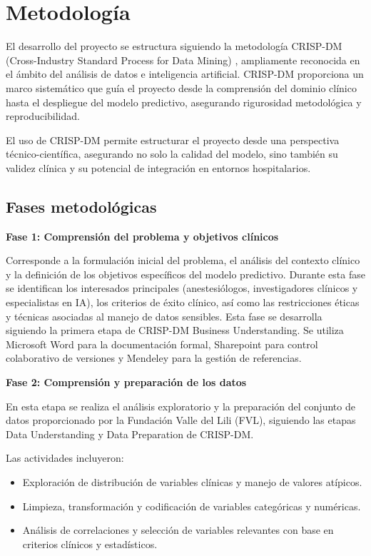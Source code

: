 \section{Metodología}

El desarrollo del proyecto se estructura siguiendo la metodología CRISP-DM (Cross-Industry Standard Process for Data Mining) \cite{crispdm1999}, ampliamente reconocida en el ámbito del análisis de datos e inteligencia artificial. CRISP-DM proporciona un marco sistemático que guía el proyecto desde la comprensión del dominio clínico hasta el despliegue del modelo predictivo, asegurando rigurosidad metodológica y reproducibilidad.

El uso de CRISP-DM permite estructurar el proyecto desde una perspectiva técnico-científica, asegurando no solo la calidad del modelo, sino también su validez clínica y su potencial de integración en entornos hospitalarios.

\subsection{Fases metodológicas}

\textbf{Fase 1: Comprensión del problema y objetivos clínicos}

Corresponde a la formulación inicial del problema, el análisis del contexto clínico y la definición de los objetivos específicos del modelo predictivo. Durante esta fase se identifican los interesados principales (anestesiólogos, investigadores clínicos y especialistas en IA), los criterios de éxito clínico, así como las restricciones éticas y técnicas asociadas al manejo de datos sensibles. Esta fase se desarrolla siguiendo la primera etapa de CRISP-DM Business Understanding. Se utiliza Microsoft Word para la documentación formal, Sharepoint para control colaborativo de versiones y Mendeley para la gestión de referencias.

\textbf{Fase 2: Comprensión y preparación de los datos}

En esta etapa se realiza el análisis exploratorio y la preparación del conjunto de datos proporcionado por la Fundación Valle del Lili (FVL), siguiendo las etapas Data Understanding y Data Preparation de CRISP-DM.

Las actividades incluyeron:

\begin{itemize}
    \item Exploración de distribución de variables clínicas y manejo de valores atípicos.
    \item Limpieza, transformación y codificación de variables categóricas y numéricas.
    \item Análisis de correlaciones y selección de variables relevantes con base en criterios clínicos y estadísticos.
\end{itemize}

